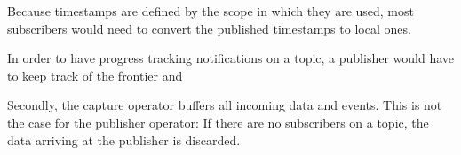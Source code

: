 Because timestamps are defined by the scope in which they are used, most subscribers would need to
convert the published timestamps to local ones.

In order to have progress tracking notifications on a topic, a publisher would
have to keep track of the frontier and 



Secondly, the capture operator buffers all incoming data and events. This is
not the case for the publisher operator: If there are no subscribers on a topic,
the data arriving at the publisher is discarded.



